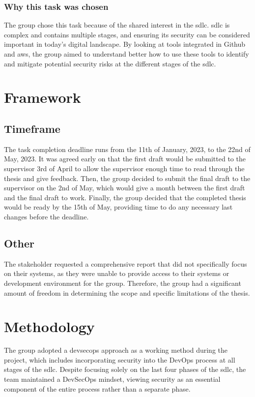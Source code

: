 \subsubsection{Why this task was chosen}
The group chose this task because of the shared interest in the \acrlong{sdlc}. \acrshort{sdlc} is complex and contains multiple stages, and ensuring its security can be considered important in today's digital landscape. By looking at tools integrated in Github and \acrshort{aws}, the group aimed to understand better how to use these tools to identify and mitigate potential security risks at the different stages of the \acrshort{sdlc}.

\newpage
\section{Framework}

\subsection{Timeframe}
The task completion deadline runs from the 11th of January, 2023, to the 22nd of May, 2023. It was agreed early on that the first draft would be submitted to the supervisor 3rd of April to allow the supervisor enough time to read through the thesis and give feedback. Then, the group decided to submit the final draft to the supervisor on the 2nd of May, which would give a month between the first draft and the final draft to work. Finally, the group decided that the completed thesis would be ready by the 15th of May, providing time to do any necessary last changes before the deadline. 


\subsection{Other}
The stakeholder requested a comprehensive report that did not specifically focus on their systems, as they were unable to provide access to their systems or development environment for the group. Therefore, the group had a significant amount of freedom in determining the scope and specific limitations of the thesis. 

\section{Methodology}
The group adopted a \acrshort{devsecops} approach as a working method during the project, which includes incorporating security into the DevOps process at all stages of the \acrshort{sdlc}. Despite focusing solely on the last four phases of the \acrshort{sdlc}, the team maintained a DevSecOps mindset, viewing security as an essential component of the entire process rather than a separate phase. 



